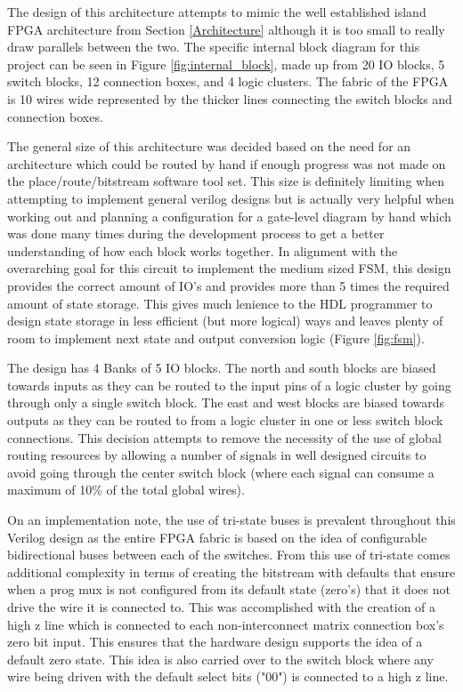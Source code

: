 \documentclass[12pt]{article}
\begin{document}
The design of this architecture attempts to mimic the well established island FPGA 
architecture from Section \ref{Architecture} although it is too small to really draw parallels between the two.
The specific internal block diagram for this project can be seen in Figure \ref{fig:internal_block},
made up from 20 IO blocks, 5 switch blocks, 12 connection boxes, and 4 logic clusters.
The fabric of the FPGA is 10 wires wide represented
by the thicker lines connecting the switch blocks and connection boxes.

The general size of this architecture was decided based on the need for an architecture
which could be routed by hand if enough progress was not made on the place/route/bitstream software
tool set. This size is definitely limiting when attempting to implement general
verilog designs but is actually very helpful when working out and planning a configuration
for a gate-level diagram by hand which was done many times during the development process
to get a better understanding of how each block works together. In alignment with the overarching
goal for this circuit to implement the medium sized FSM, this design provides the correct amount
of IO's and provides more than 5 times the required amount of state storage. This gives much lenience 
to the HDL programmer to design state storage in less efficient (but more logical) ways and leaves
plenty of room to implement next state and output conversion logic (Figure \ref{fig:fsm}).

The design has 4 Banks of 5 IO blocks. The north and south blocks are biased towards inputs
as they can be routed to the input pins of a logic cluster by going through only a single switch
block. The east and west blocks are biased towards outputs as they can be routed to from a logic
cluster in one or less switch block connections. This decision attempts to remove the necessity 
of the use of global routing resources by allowing a number of signals
in well designed circuits to avoid going through the center switch block (where each signal can
consume a maximum of 10\% of the total global wires).

On an implementation note, the use of tri-state buses is prevalent throughout this Verilog
design as the entire FPGA fabric is based on the idea of configurable bidirectional buses
between each of the switches. From this use of tri-state comes additional complexity in
terms of creating the bitstream with defaults that ensure when a prog mux is not configured
from its default state (zero's) that it does not drive the wire it is connected to.
This was accomplished with the creation of a high z line which is connected to each non-interconnect
matrix connection box's zero bit input. This ensures that the hardware design supports the idea
of a default zero state. This idea is also carried over to the switch block where any wire
being driven with the default select bits ("00") is connected to a high z line.
\end{document}
